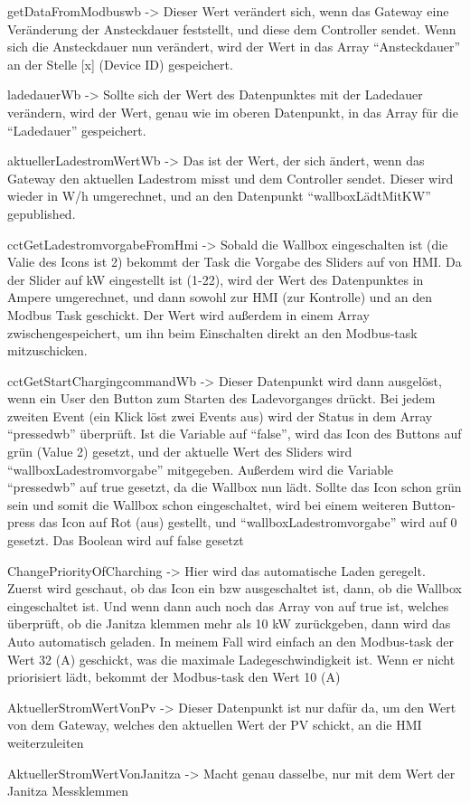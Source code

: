 \begin{compactitem}
  \item getDataFromModbuswb -> Dieser Wert verändert sich, wenn das Gateway eine Veränderung der Ansteckdauer feststellt, und diese dem Controller sendet. Wenn sich die Ansteckdauer nun verändert, wird der Wert in das Array “Ansteckdauer” an der Stelle [x] (Device ID) gespeichert.  
  \item ladedauerWb -> Sollte sich der Wert des Datenpunktes mit der Ladedauer verändern, wird der Wert, genau wie im oberen Datenpunkt, in das Array für die “Ladedauer” gespeichert. 
  \item aktuellerLadestromWertWb -> Das ist der Wert, der sich ändert, wenn das Gateway den aktuellen Ladestrom misst und dem Controller sendet. Dieser wird wieder in W/h umgerechnet, und an den Datenpunkt “wallboxLädtMitKW” gepublished. 
  \item cctGetLadestromvorgabeFromHmi -> Sobald die Wallbox eingeschalten ist (die Valie des Icons ist 2) bekommt der Task die Vorgabe des Sliders auf von HMI. Da der Slider auf kW eingestellt ist (1-22), wird der Wert des Datenpunktes in Ampere umgerechnet, und dann sowohl zur HMI (zur Kontrolle) und an den Modbus Task geschickt. Der Wert wird außerdem in einem Array zwischengespeichert, um ihn beim Einschalten direkt an den Modbus-task mitzuschicken. 
  \item cctGetStartChargingcommandWb -> Dieser Datenpunkt wird dann ausgelöst, wenn ein User den Button zum Starten des Ladevorganges drückt. Bei jedem zweiten Event (ein Klick löst zwei Events aus) wird der Status in dem Array “pressedwb” überprüft. Ist die Variable auf “false”, wird das Icon des Buttons auf grün (Value 2) gesetzt, und der aktuelle Wert des Sliders wird “wallboxLadestromvorgabe” mitgegeben. Außerdem wird die Variable “pressedwb” auf true gesetzt, da die Wallbox nun lädt. Sollte das Icon schon grün sein und somit die Wallbox schon eingeschaltet, wird bei einem weiteren Button-press das Icon auf Rot (aus) gestellt, und “wallboxLadestromvorgabe” wird auf 0 gesetzt. Das Boolean wird auf false gesetzt 
  \item ChangePriorityOfCharching -> Hier wird das automatische Laden geregelt. Zuerst wird geschaut, ob das Icon ein bzw ausgeschaltet ist, dann, ob die Wallbox eingeschaltet ist. Und wenn dann auch noch das Array von auf true ist, welches überprüft, ob die Janitza klemmen mehr als 10 kW zurückgeben, dann wird das Auto automatisch geladen. In meinem Fall wird einfach an den Modbus-task der Wert 32 (A) geschickt, was die maximale Ladegeschwindigkeit ist. Wenn er nicht priorisiert lädt, bekommt der Modbus-task den Wert 10 (A) 
  \item AktuellerStromWertVonPv -> Dieser Datenpunkt ist nur dafür da, um den Wert von dem Gateway, welches den aktuellen Wert der PV schickt, an die HMI weiterzuleiten 
  \item AktuellerStromWertVonJanitza -> Macht genau dasselbe, nur mit dem Wert der Janitza Messklemmen 
\end{compactitem}

